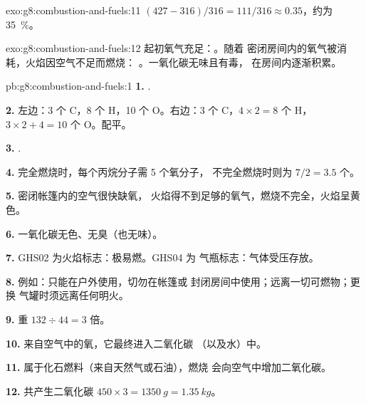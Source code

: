 \begin{solution}{exo:g8:combustion-and-fuels:11}
$(427 - 316)/316 = 111/316 \approx 0.35$，约为 \qty{35}{\percent}。
\end{solution}

\begin{solution}{exo:g8:combustion-and-fuels:12}
起初氧气充足：。随着
密闭房间内的氧气被消耗，火焰因空气不足而燃烧：
。一氧化碳无味且有毒，
在房间内逐渐积累。
\end{solution}

\begin{solution}{pb:g8:combustion-and-fuels:1}
\textbf{1.} .

\textbf{2.} 左边：3 个 C，8 个 H，10 个 O。右边：3 个 C，$4 \times 2 = 8$ 个 H，
$3 \times 2 + 4 = 10$ 个 O。配平。

\textbf{3.} .

\textbf{4.} 完全燃烧时，每个丙烷分子需 5 个氧分子，
不完全燃烧时则为 $7/2 = 3.5$ 个。

\textbf{5.} 密闭帐篷内的空气很快缺氧，
火焰得不到足够的氧气，燃烧不完全，火焰呈黄色。

\textbf{6.} 一氧化碳无色、无臭（也无味）。

\textbf{7.} GHS02 为火焰标志：极易燃。GHS04 为
气瓶标志：气体受压存放。

\textbf{8.} 例如：只能在户外使用，切勿在帐篷或
封闭房间中使用；远离一切可燃物；更换
气罐时须远离任何明火。

\textbf{9.} 重 $132 \div 44 = 3$ 倍。

\textbf{10.} 来自空气中的氧，它最终进入二氧化碳
（以及水）中。

\textbf{11.} 属于化石燃料（来自天然气或石油），燃烧
会向空气中增加二氧化碳。

\textbf{12.} 共产生二氧化碳
$450 \times 3 = \qty{1350}{g} = \qty{1.35}{kg}$。
\end{solution}
